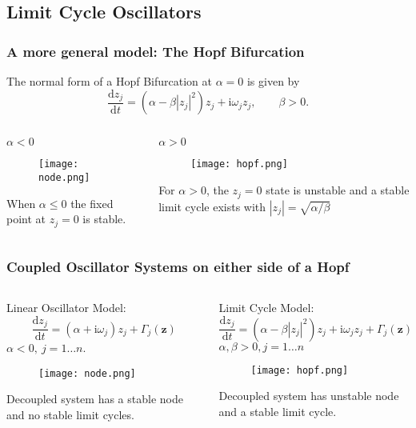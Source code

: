 \documentclass[10pt,reqno]{beamer}
\newcommand{\D}[2]{\frac{\mathrm{d} #1}{\mathrm{d} #2}}
\newcommand{\I}{\mathrm{i}}
\begin{document}
\subsection{Limit Cycle Oscillators}
\begin{frame}
\frametitle{A more general model: The Hopf Bifurcation}
The normal form of a Hopf Bifurcation at $\alpha = 0$ is given by
\[
\D{z_j}{t}= (\alpha - \beta|z_j|^2)z_j + \I\omega_j z_j, \qquad \beta >0.
\]
\begin{columns}[t]
\begin{column}{.49\textwidth}
\centering
$\alpha <0$
\begin{figure}
	\texttt{[image: node.png]}
\end{figure}
When $\alpha \le 0$ the fixed point at $z_j =0$ is stable.
\end{column}
\begin{column}{.49\textwidth}
\centering
$\alpha >0$
\begin{figure}
	\texttt{[image: hopf.png]}
\end{figure}
For $\alpha>0$, the $z_j=0$ state is unstable and a stable limit cycle exists with $|z_j| = \sqrt{\alpha/\beta}$				
\end{column}
\end{columns}
\end{frame}
\begin{frame}
\frametitle{Coupled Oscillator Systems on either side of a Hopf}
\begin{columns}[t]
\begin{column}{.49\textwidth}
\centering
Linear Oscillator Model:
\[
\D{z_j}{t} = (\alpha +\I\omega_j)z_j+\Gamma_j(\mathbf{z})
\]
$\alpha <0,\ j = 1\dots n$.
\begin{figure}
	\texttt{[image: node.png]}
\end{figure}
Decoupled system has a stable node and no stable limit cycles.
\end{column}
\begin{column}{.49\textwidth}
\centering
Limit Cycle Model:
\[
\D{z_j}{t} = (\alpha - \beta|z_j|^2)z_j + \I\omega_jz_j +\Gamma_j(\mathbf{z})
\]
$\alpha,\beta>0, j = 1\dots n$
\begin{figure}
	\texttt{[image: hopf.png]}
\end{figure}
Decoupled system has unstable node and a stable limit cycle.
\end{column}
\end{columns}
\end{frame}
\end{document}
